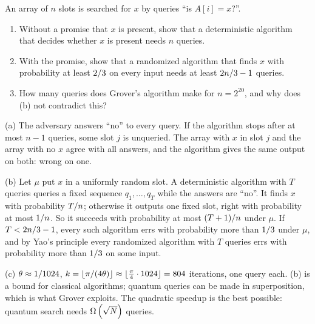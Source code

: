 \begin{question}
    An array of $n$ slots is searched for $x$ by queries ``is $A[i] = x$?''.
    \begin{enumerate}[label=(\alph*)]
        \item Without a promise that $x$ is present, show that a deterministic algorithm that
              decides whether $x$ is present needs $n$ queries.
        \item With the promise, show that a randomized algorithm that finds $x$ with probability
              at least $2/3$ on every input needs at least $2n/3 - 1$ queries.
        \item How many queries does Grover's algorithm make for $n = 2^{20}$, and why does (b) not
              contradict this?
    \end{enumerate}
\end{question}
\begin{msolution}
    (a) The adversary answers ``no'' to every query. If the algorithm stops after at most $n - 1$
    queries, some slot $j$ is unqueried. The array with $x$ in slot $j$ and the array with no $x$
    agree with all answers, and the algorithm gives the same output on both: wrong on one.

    (b) Let $\mu$ put $x$ in a uniformly random slot. A deterministic algorithm with $T$ queries
    queries a fixed sequence $q_1, \dots, q_T$ while the answers are ``no''. It finds $x$ with
    probability $T/n$; otherwise it outputs one fixed slot, right with probability at
    most $1/n$. So it succeeds with probability at most $(T+1)/n$ under $\mu$.
    If $T < 2n/3 - 1$, every such algorithm errs with probability more than $1/3$
    under $\mu$, and by Yao's principle every randomized algorithm with $T$ queries errs with
    probability more than $1/3$ on some input.

    (c) $\theta \approx 1/1024$, $k = \floor{\sfrac{\pi}{(4\theta)}} \approx
    \floor{\frac{\pi}{4} \cdot 1024} = 804$ iterations, one query each. (b) is a bound for
    classical algorithms; quantum queries can be made in superposition, which is what Grover
    exploits. The quadratic speedup is the best possible: quantum search needs
    $\Omega\left(\sqrt{N}\right)$ queries.
\end{msolution}
